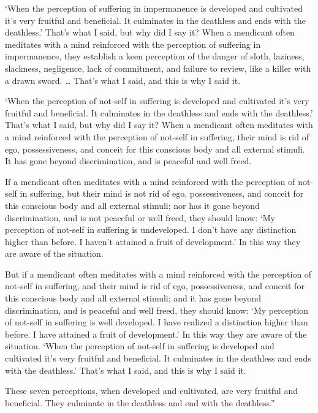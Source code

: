 \documentclass[12pt,openany]{book}%
\begin{document}
‘When the perception of suffering in impermanence is developed and cultivated it’s very fruitful and beneficial. It culminates in the deathless and ends with the deathless.’ That’s what I said, but why did I say it? When a mendicant often meditates with a mind reinforced with the perception of suffering in impermanence, they establish a keen perception of the danger of sloth, laziness, slackness, negligence, lack of commitment, and failure to review, like a killer with a drawn sword. … That’s what I said, and this is why I said it. 

‘When the perception of not-self in suffering is developed and cultivated it’s very fruitful and beneficial. It culminates in the deathless and ends with the deathless.’ That’s what I said, but why did I say it? When a mendicant often meditates with a mind reinforced with the perception of not-self in suffering, their mind is rid of ego, possessiveness, and conceit for this conscious body and all external stimuli. It has gone beyond discrimination, and is peaceful and well freed. 

If a mendicant often meditates with a mind reinforced with the perception of not-self in suffering, but their mind is not rid of  ego, possessiveness, and conceit for this conscious body and all external stimuli; nor has it gone beyond discrimination, and is not peaceful or well freed, they should know: ‘My perception of not-self in suffering is undeveloped. I don’t have any distinction higher than before. I haven’t attained a fruit of development.’ In this way they are aware of the situation. 

But if a mendicant often meditates with a mind reinforced with the perception of not-self in suffering, and their mind is rid of  ego, possessiveness, and conceit for this conscious body and all external stimuli; and it has gone beyond discrimination, and is peaceful and well freed, they should know: ‘My perception of not-self in suffering is well developed. I have realized a distinction higher than before. I have attained a fruit of development.’ In this way they are aware of the situation. ‘When the perception of not-self in suffering is developed and cultivated it’s very fruitful and beneficial. It culminates in the deathless and ends with the deathless.’ That’s what I said, and this is why I said it. 

These seven perceptions, when developed and cultivated, are very fruitful and beneficial. They culminate in the deathless and end with the deathless.” 
\end{document}
